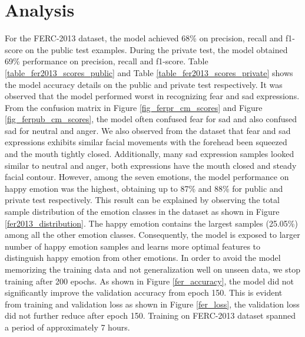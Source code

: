 \documentclass[master]{thesis-uestc}
\begin{document}
\section{Analysis}
For the FERC-2013 dataset, the model achieved 68\% on precision, recall and f1-score on the public test examples. During the private test, the model obtained 69\% performance on precision, recall and f1-score. Table \ref{table_fer2013_scores_public} and Table \ref{table_fer2013_scores_private} shows the model accuracy details on the public and private test respectively. It was observed that the model performed worst in recognizing fear and sad expressions. From the confusion matrix in Figure \ref{fig_ferpr_cm_scores} and Figure \ref{fig_ferpub_cm_scores}, the model often confused fear for sad and also confused sad for neutral and anger. We also observed from the dataset that fear and sad expressions exhibits similar facial movements with the forehead been squeezed and the mouth tightly closed. Additionally, many sad expression samples looked similar to neutral and anger, both expressions have the mouth closed and steady facial contour. However, among the seven emotions, the model performance on happy emotion was the highest, obtaining up to 87\% and 88\% for public and private test respectively. This result can be explained by observing the total sample distribution of the emotion classes in the dataset as shown in Figure \ref{fer2013_distribution}. The happy emotion contains the largest samples (25.05\%) among all the other emotion classes. Consequently, the model is exposed to larger number of happy emotion samples and learns more optimal features to distinguish happy emotion from other emotions. In order to avoid the model memorizing the training data and not generalization well on unseen data, we stop training after 200 epochs. As shown in Figure \ref{fer_accuracy}, the model did not significantly improve the validation accuracy from epoch 150. This is evident from training and validation loss as shown in Figure \ref{fer_loss}, the validation loss did not further reduce after epoch 150. Training on FERC-2013 dataset spanned a period of approximately 7 hours.
\end{document}

